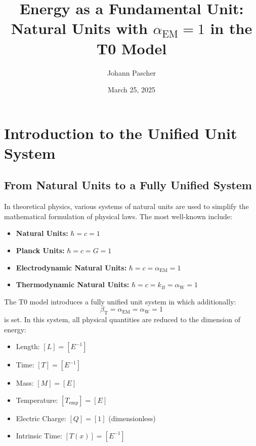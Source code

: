 \documentclass[12pt,a4paper]{article}
\newcommand{\Tfield}{T(x)}
\newcommand{\betaT}{\beta_{\text{T}}}
\newcommand{\alphaEM}{\alpha_{\text{EM}}}
\newcommand{\alphaW}{\alpha_{\text{W}}}
\begin{document}
	
	\title{Energy as a Fundamental Unit: \\ Natural Units with \(\alphaEM = 1\) in the T0 Model}
	\author{Johann Pascher}
	\date{March 25, 2025}
	
	\maketitle
	\tableofcontents
	\newpage
	
	\section{Introduction to the Unified Unit System}
	
	\subsection{From Natural Units to a Fully Unified System}
	
	In theoretical physics, various systems of natural units are used to simplify the mathematical formulation of physical laws. The most well-known include:
	
	\begin{itemize}
		\item \textbf{Natural Units:} \(\hbar = c = 1\)
		\item \textbf{Planck Units:} \(\hbar = c = G = 1\)
		\item \textbf{Electrodynamic Natural Units:} \(\hbar = c = \alphaEM = 1\)
		\item \textbf{Thermodynamic Natural Units:} \(\hbar = c = k_B = \alphaW = 1\)
	\end{itemize}
	
	The T0 model introduces a fully unified unit system in which additionally:
	\begin{equation}
		\betaT = \alphaEM = \alphaW = 1
	\end{equation}
	is set. In this system, all physical quantities are reduced to the dimension of energy:
	
	\begin{tcolorbox}[colback=blue!5!white,colframe=blue!75!black,title=Dimensions in the Unified Unit System]
		\begin{itemize}
			\item Length: \([L] = [E^{-1}]\)
			\item Time: \([T] = [E^{-1}]\)
			\item Mass: \([M] = [E]\)
			\item Temperature: \([T_{\text{emp}}] = [E]\)
			\item Electric Charge: \([Q] = [1]\) (dimensionless)
			\item Intrinsic Time: \([\Tfield] = [E^{-1}]\)
		\end{itemize}
	\end{tcolorbox}
	
\end{document}
